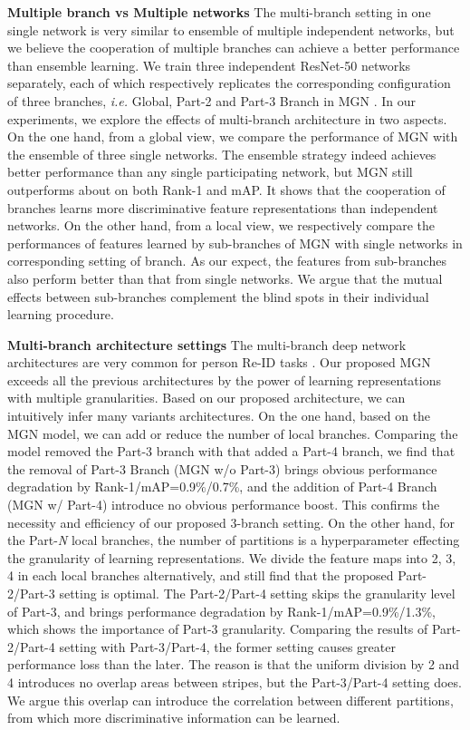 \documentclass[sigconf]{acmart}
\begin{document}
\textbf{Multiple branch vs Multiple networks} The multi-branch setting in one single network is very similar to ensemble of multiple independent networks, but we believe the cooperation of multiple branches can achieve a better performance than ensemble learning. We train three independent ResNet-50 networks separately, each of which respectively replicates the corresponding configuration of three branches, \textit{i.e.} Global, Part-2 and Part-3 Branch in MGN . In our experiments, we explore the effects of multi-branch architecture in two aspects. On the one hand, from a global view, we compare the performance of MGN with the ensemble of three single networks. The ensemble strategy indeed achieves better performance than any single participating network, but MGN still outperforms about  on both Rank-1 and mAP. It shows that the cooperation of branches learns more discriminative feature representations than independent networks. On the other hand, from a local view, we respectively compare the performances of features learned by sub-branches of MGN with single networks in corresponding setting of branch. As our expect, the features from sub-branches also perform better than that from single networks. We argue that the mutual effects between sub-branches complement the blind spots in their individual learning procedure. 

\textbf{Multi-branch architecture settings} The multi-branch deep network architectures are very common for person Re-ID tasks \cite{cheng2016perso}. Our proposed MGN exceeds all the previous architectures by the power of learning representations with multiple granularities. Based on our proposed architecture, we can intuitively infer many variants architectures. On the one hand, based on the MGN model, we can add or reduce the number of local branches. Comparing the model removed the Part-3 branch with that added a Part-4 branch, we find that the removal of Part-3 Branch (MGN w/o Part-3) brings obvious performance degradation by Rank-1/mAP=0.9\%/0.7\%, and the addition of Part-4 Branch (MGN w/ Part-4) introduce no obvious performance boost. This confirms the necessity and efficiency of our proposed 3-branch setting. On the other hand, for the Part-\textit{N} local branches, the number of partitions is a hyperparameter effecting the granularity of learning representations. We divide the feature maps into 2, 3, 4 in each local branches alternatively, and still find that the proposed Part-2/Part-3 setting is optimal. The Part-2/Part-4 setting skips the granularity level of Part-3, and brings performance degradation by Rank-1/mAP=0.9\%/1.3\%, which shows the importance of Part-3 granularity. Comparing the results of Part-2/Part-4 setting with Part-3/Part-4, the former setting causes greater performance loss than the later. The reason is that the uniform division by 2 and 4 introduces no overlap areas between stripes, but the Part-3/Part-4 setting does. We argue this overlap can introduce the correlation between different partitions, from which more discriminative information can be learned.
\end{document}
